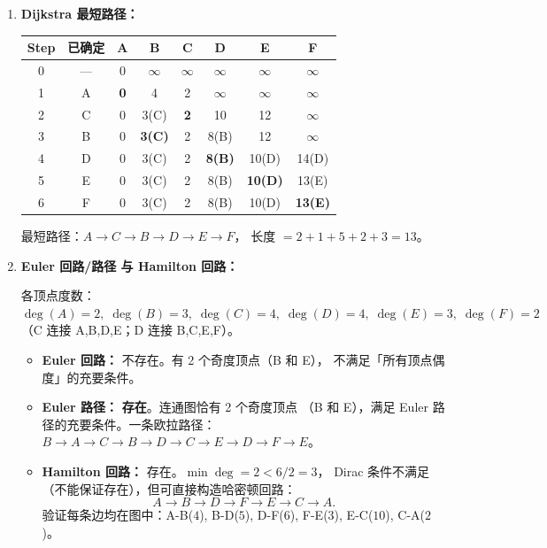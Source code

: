 \documentclass[11pt,a4paper,fontset=mac]{ctexart}
\begin{document}
\begin{enumerate}[label=(\alph*)]
  \item \textbf{Dijkstra 最短路径：}

  \medskip
  \begin{center}
  \begin{tabular}{c|c|c|c|c|c|c|c}
  \toprule
  Step & 已确定 & A & B & C & D & E & F \\
  \midrule
  0 & ---   & 0 & $\infty$ & $\infty$ & $\infty$ & $\infty$ & $\infty$ \\
  1 & A     & \textbf{0} & 4 & 2 & $\infty$ & $\infty$ & $\infty$ \\
  2 & C     & 0 & 3\;(C) & \textbf{2} & 10 & 12 & $\infty$ \\
  3 & B     & 0 & \textbf{3\;(C)} & 2 & 8\;(B) & 12 & $\infty$ \\
  4 & D     & 0 & 3\;(C) & 2 & \textbf{8\;(B)} & 10\;(D) & 14\;(D) \\
  5 & E     & 0 & 3\;(C) & 2 & 8\;(B) & \textbf{10\;(D)} & 13\;(E) \\
  6 & F     & 0 & 3\;(C) & 2 & 8\;(B) & 10\;(D) & \textbf{13\;(E)} \\
  \bottomrule
  \end{tabular}
  \end{center}

  最短路径：$A \to C \to B \to D \to E \to F$，
  长度 $= 2+1+5+2+3 = 13$。

  \item \textbf{Euler 回路/路径 与 Hamilton 回路：}

  各顶点度数：$\deg(A)=2,\; \deg(B)=3,\; \deg(C)=4,\;
  \deg(D)=4,\; \deg(E)=3,\; \deg(F)=2$
  （C 连接 A,B,D,E；D 连接 B,C,E,F）。

  \begin{itemize}
    \item \textbf{Euler 回路：} 不存在。有 2 个奇度顶点（B 和 E），
    不满足「所有顶点偶度」的充要条件。
    \item \textbf{Euler 路径：} \textbf{存在}。连通图恰有 2 个奇度顶点
    （B 和 E），满足 Euler 路径的充要条件。一条欧拉路径：
    $B \to A \to C \to B \to D \to C \to E \to D \to F \to E$。
    \item \textbf{Hamilton 回路：} 存在。$\min\deg = 2 < 6/2 = 3$，
    Dirac 条件不满足（不能保证存在），但可直接构造哈密顿回路：
    \[
    A \to B \to D \to F \to E \to C \to A.
    \]
    验证每条边均在图中：A-B($4$), B-D($5$), D-F($6$), F-E($3$), E-C($10$), C-A($2$)。
  \end{itemize}
\end{enumerate}
\end{document}
